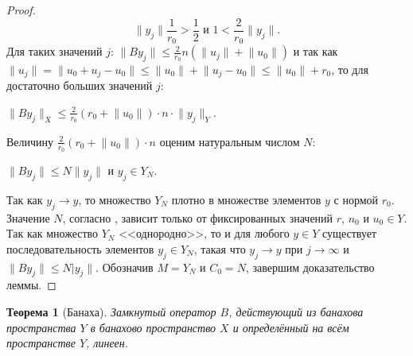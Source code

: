 \documentclass[12pt,a4paper,titlepage,oneside]{book}
\theoremstyle{definition}
\theoremstyle{plain}
\newtheorem*{theorem}{Теорема}
\theoremstyle{break}
\theoremstyle{remark}
\theoremstyle{remark}
\theoremstyle{remark}
\theoremstyle{remark}
\theoremstyle{plain}
\theoremstyle{plain}
\begin{document}
\begin{proof}
$$\lVert y_j\rVert\frac{1}{r_0}>\frac12 \mbox{ и } 1<\frac{2}{r_0}\lVert y_j\rVert.$$
Для таких значений $j$: $\lVert By_j \rVert \leqslant \frac{2}{r_0}n(\lVert u_j \rVert + \lVert u_0 \rVert)$ и так как $\lVert u_j \rVert = \lVert u_0 + u_j - u_0 \rVert \leqslant \lVert u_0 \rVert + \lVert u_j - u_0 \rVert \leqslant \lVert u_0 \rVert + r_0$, то для достаточно больших значений $j$:

\begin{center}
$\lVert By_j\rVert_X \leqslant \frac{2}{r_0}(r_0 + \lVert u_0\rVert)\cdot n\cdot \lVert y_j\rVert_Y$.
\end{center}

Величину $\frac{2}{r_0}(r_0 + \lVert u_0\rVert)\cdot n$ оценим натуральным числом $N$:

\begin{center}
$\lVert By_j\rVert \leqslant N\lVert y_j\rVert$ и $y_j \in Y_N$.
\end{center}

Так как $y_j \to y$, то множество $Y_N$ плотно в множестве элементов $y$ с нормой $r_0$. Значение $N$, согласно , зависит только от фиксированных значений $r$, $n_0$ и $u_0 \in Y$. Так как множество $Y_N$ <<однородно>>, то и для любого $y \in Y$ существует последовательность элементов $y_j \in Y_N$, такая что $y_j \to y$ при $j \to \infty$ и $\lVert By_j\rVert \leqslant N\lvert y_j\rVert$. Обозначив $M = Y_N$ и $C_0 = N$, завершим доказательство леммы.
\end{proof}

\begin{theorem}[Банаха]
Замкнутый оператор $B$, действующий из банахова пространства $Y$ в банахово пространство $X$ и определённый на всём пространстве $Y$, линеен.
\end{theorem}
\end{document}
